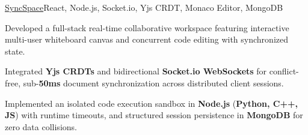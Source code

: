 \begin{cvproject}{\uline{SyncSpace}}{React, Node.js, Socket.io, Yjs CRDT, Monaco Editor, MongoDB}
    \item Developed a full-stack real-time collaborative workspace featuring interactive multi-user whiteboard canvas and concurrent code editing with synchronized state.
    \item Integrated \textbf{Yjs CRDTs} and bidirectional \textbf{Socket.io WebSockets} for conflict-free, sub-\textbf{50ms} document synchronization across distributed client sessions.
    \item Implemented an isolated code execution sandbox in \textbf{Node.js} (\textbf{Python, C++, JS}) with runtime timeouts, and structured session persistence in \textbf{MongoDB} for zero data collisions.
\end{cvproject}
